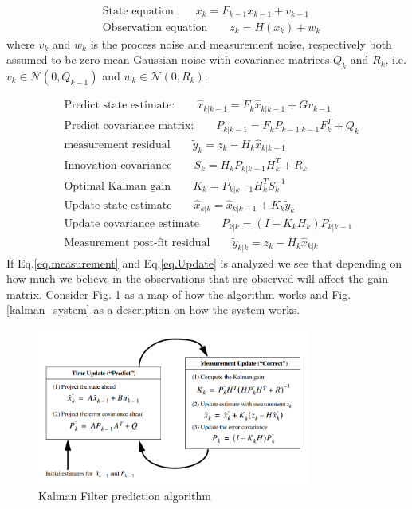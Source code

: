 \newpage



















\begin{align}
&\textrm{State equation} \qquad x_k=F_{k-1}x_{k-1}+v_{k-1}\\
& \textrm{Observation equation} \qquad z_k=H(x_k)+w_k
\end{align}
where $v_k$ and $w_k$ is the process noise and measurement noise, respectively both assumed to be zero mean Gaussian noise with covariance matrices $Q_k$ and $R_k$, i.e. $v_k\in\mathcal{N}(0, Q_{k-1})$ and $w_k\in\mathcal{N}(0, R_k)$.

\begin{align}
&\textrm{Predict state estimate:} \qquad \hat{x}_{k|k-1}=F_k\hat{x}_{k|k-1}+Gv_{k-1}\\
&\textrm{Predict covariance matrix:}\qquad P_{k|k-1}=F_{k}P_{k-1|k-1}F^T_{k}+Q_{k}\\
\label{eq.measurement}
&\textrm{measurement residual}\qquad \tilde{y}_k=z_k-H_k\hat{x}_{k|k-1}\\
&\textrm{Innovation covariance}\qquad S_k=H_kP_{k|k-1}H_k^T+R_k \\
&\textrm{Optimal Kalman gain}\qquad K_k=P_{k|k-1}H_k^TS_k^{-1}\\
\label{eq.Update}
&\textrm{Update state estimate}\qquad \hat{x}_{k|k}=\hat{x}_{k|k-1}+K_k\tilde{y}_k\\
&\textrm{Update covariance estimate}\qquad P_{k|k}=(I-K_kH_k)P_{k|k-1}\\
&\textrm{Measurement post-fit residual} \qquad \tilde{y}_{k|k}=z_k-H_k\hat{x}_{k|k}
\end{align}
If Eq.\eqref{eq.measurement} and Eq.\eqref{eq.Update} is analyzed we see that depending on how much we believe in the observations that are observed will affect the gain matrix. Consider Fig. \ref{kalman_algo} as a map of how the algorithm works and Fig. \ref{kalman_system} as a description on how the system works.
\begin{figure}[H]
\centering
\includegraphics[width=0.8\textwidth]{kalman_algo}
\caption{Kalman Filter prediction algorithm}
\label{kalman_algo}
\end{figure}

